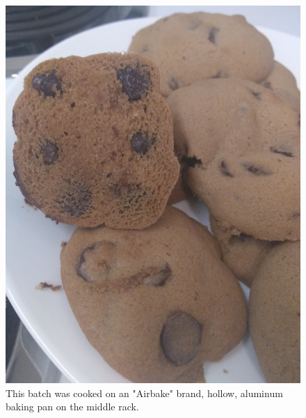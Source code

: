 \documentclass[12pt, letterpaper]{article}
\begin{document}
\begin{flushleft}


\begin{figure}[H]
\begin{center}
\includegraphics[width=0.6\linewidth]{./pics/cookies.jpg}
\caption{This batch was cooked on an "Airbake" brand, hollow, aluminum baking pan on the middle rack.}
\end{center}
\end{figure}


\end{flushleft}
\end{document}
